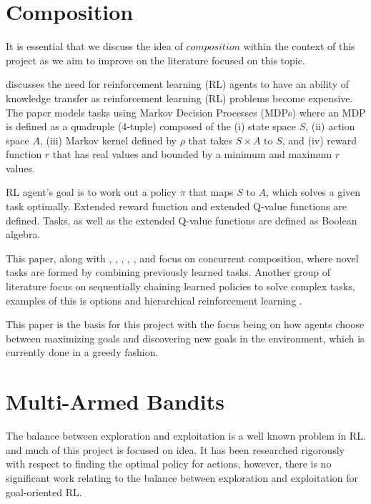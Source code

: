 \documentclass[11pt]{report}
\begin{document}
\section{Composition} \label{composition}
It is essential that we discuss the idea of $composition$ \citep{todorov2009compositionality} within the context of 
this project as we aim to improve on the literature focused on this topic.

\citet{nangue2020boolean} discusses the need for reinforcement learning (RL) agents to have an ability of knowledge 
transfer as reinforcement learning (RL) problems become expensive. The paper models tasks using Markov Decision Processes
(MDPs) where an MDP is defined as a quadruple (4-tuple) composed of the (i) state space $S$, (ii) action space $A$, (iii)
Markov kernel defined by $\rho$ that takes $S\times A$ to $S$, and (iv) reward function $r$ that has real values and 
bounded by a minimum and maximum $r$ values.

RL agent's goal is to work out a policy $\pi$ that maps $S$ to $A$, which solves a given task optimally. Extended reward 
function and extended Q-value functions are defined. Tasks, as well as the extended Q-value functions are defined 
as Boolean algebra.

This paper, along with \citet{todorov2009compositionality}, \citet{saxe2017hierarchy}, \citet{haarnoja2018composable}, 
\citet{van2019composing}, \citet{hunt2019composing}, and \citet{peng2019mcp} focus on concurrent composition, where 
novel tasks are formed by combining previously learned tasks. Another group of literature focus on sequentially chaining 
learned policies to solve complex tasks, examples of this is options \citep{sutton1999between} and hierarchical 
reinforcement learning \citep{barto2003recent}.

This paper is the basis for this project with the focus being on how agents choose between maximizing goals and 
discovering new goals in the environment, which is currently done in a greedy fashion.

\section{Multi-Armed Bandits}
The balance between exploration and exploitation is a well known problem in RL. and much of this project is focused on 
idea. It has been researched rigorously with respect to finding the optimal policy for actions, however, there is no 
significant work relating to the balance between exploration and exploitation for goal-oriented RL.
\end{document}
